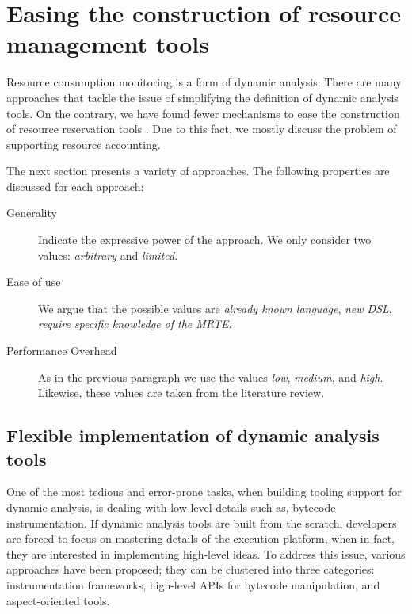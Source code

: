 \section{Easing the construction of resource management tools}

Resource consumption monitoring is a form of dynamic analysis.
There are many approaches that tackle the issue of simplifying the definition of dynamic analysis tools.
On the contrary, we have found fewer mechanisms to ease the construction of resource reservation tools \cite{mueller}.
Due to this fact, we mostly discuss the problem of supporting resource accounting. 

The next section presents a variety of approaches. The following properties are discussed for each approach:

\begin{description}
\item[Generality] Indicate the expressive power of the approach. We only consider two values: \textit{arbitrary} and \textit{limited}.

\item[Ease of use] We argue that the possible values are \textit{already known language}, \textit{new DSL}, \textit{require specific knowledge of the MRTE}.

\item[Performance Overhead] As in the previous paragraph we use the values \textit{low}, \textit{medium}, and \textit{high}.
Likewise, these values are taken from the literature review.
\end{description}

\subsection{Flexible implementation of dynamic analysis tools}

One of the most tedious and error-prone tasks, when building tooling support for dynamic analysis, is dealing with low-level details such as, bytecode instrumentation.
If dynamic analysis tools are built from the scratch, developers are forced to focus on mastering details of the execution platform, when in fact, they are interested in implementing high-level ideas.
To address this issue, various approaches have been proposed; they can be clustered into three categories: instrumentation frameworks, high-level APIs for bytecode manipulation, and aspect-oriented tools.

